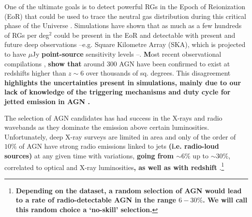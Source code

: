 \documentclass{aa}
\begin{document}
One of the ultimate goals is to detect powerful RGs in the Epoch of Reionization (EoR) that could be used to trace the neutral gas distribution during this critical phase of the Universe \citep[e.g.][]{2004NewAR..48.1029C, 2013MNRAS.435..460J}. Simulations  have shown that as much as a few hundreds of RGs per deg$^2$ could be present in the EoR \citep[][]{2019MNRAS.485.2694A, 2019MNRAS.482....2B, 2021MNRAS.503.3492T} and detectable with present and future deep observations --e.g. Square Kilometre Array (SKA), which is projected to have $\mu$Jy \textbf{point-source} sensitivity levels \textbf{\citep[SKA1-Mid is expected to reach close to $2 \, \mu$Jy in $1$-hour continuum observations at $\nu\,{\gtrsim} 1$ GHz;][]{2015aska.confE..67P, 2019arXiv191212699B}}--. \textbf{M}ost recent observational compilations \citep[e.g.][]{2020ARA&A..58...27I, 2020MNRAS.494..789R, sarah_e_i_bosman_2022_6039724, 2023ARA&A..61..373F}, \textbf{show that} around $300$ AGN have been confirmed to exist at redshifts higher than $z{\sim}6$ over thousands of sq. degrees. This disagreement \textbf{highlights the uncertainties present in simulations, mainly due to our lack of knowledge of the triggering mechanisms and duty cycle for jetted emission in AGN \citep{2015aska.confE..71A, 2022MNRAS.510.1163P}.}

The selection of AGN candidates has had success in the X-rays and radio wavebands as they dominate the emission above certain luminosities. Unfortunately, deep X-ray surveys are limited in area and only of the order of $10\%$ of AGN have strong radio emissions linked to jets \textbf{(i.e. radio-loud sources)} at any given time with variations, \textbf{going from $\sim 6\%$} up to \textbf{$\sim 30\%$}, correlated to optical and X-ray luminosities\textbf{, as well as with redshift} \citep[e.g.][]{1993MNRAS.263..461P, 1994ApJ...430..533D, 2007ApJ...656..680J, 2019NatAs...3...48S, 2019A&A...622A..11G, 2021MNRAS.506.5888M, 2021A&A...656A.137G, 2022A&A...668A..27G, 2023MNRAS.tmp.1261B}.\footnote{\textbf{Depending on the dataset, a random selection of AGN would lead to a rate of radio-detectable AGN in the range $6 - 30 \%$. We will call this random choice a `no-skill' selection.}}

\end{document}
